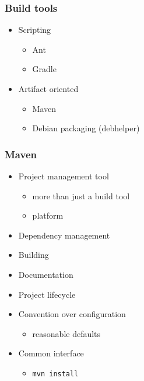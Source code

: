 \documentclass[10pt,xcolor=pdflatex]{beamer}
\begin{document}
\begin{frame}\frametitle{Build tools}
\begin{itemize}
  \item Scripting
    \begin{itemize}
      \item Ant
      \item Gradle
    \end{itemize}
  \item Artifact oriented
    \begin{itemize}
      \item Maven
      \item Debian packaging (debhelper)
    \end{itemize}
\end{itemize}
\end{frame}


\begin{frame}\frametitle{Maven}
\begin{itemize}
	\item Project management tool
	  \begin{itemize}
        \item more than just a build tool
        \item platform
	  \end{itemize}
    \item Dependency management
    \item Building
    \item Documentation
	\item Project lifecycle
	\item Convention over configuration
      \begin{itemize}
    	\item reasonable defaults
      \end{itemize}
    \item Common interface
      \begin{itemize}
    	\item \texttt{mvn install}
      \end{itemize}
\end{itemize}
\end{frame}
\end{document}
